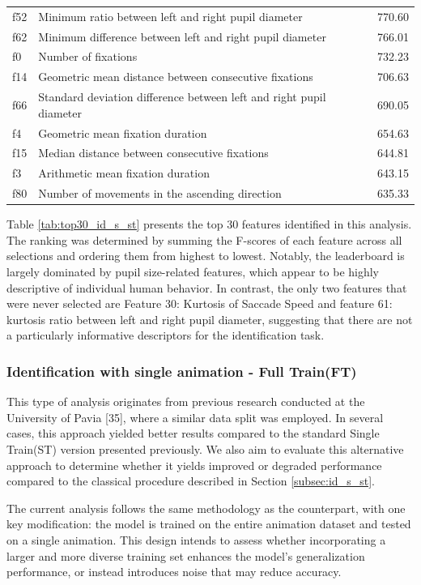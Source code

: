 \documentclass{article}
\begin{document}
\begin{table}[htbp]
\begin{tabular}{lll}
f52 & Minimum ratio between left and right pupil diameter & 770.60 \\
f62 & Minimum difference between left and right pupil diameter & 766.01 \\
f0 & Number of fixations & 732.23 \\
f14 & Geometric mean distance between consecutive fixations & 706.63 \\
f66 & Standard deviation difference between left and right pupil diameter & 690.05 \\
f4 & Geometric mean fixation duration & 654.63 \\
f15 & Median distance between consecutive fixations & 644.81 \\
f3 & Arithmetic mean fixation duration & 643.15 \\
f80 & Number of movements in the ascending direction & 635.33 \\
\bottomrule
\end{tabular}
\end{table}

Table \ref{tab:top30_id_s_st} presents the top 30 features identified in this analysis.
The ranking was determined by summing the F-scores of each feature across all selections and ordering them from highest to lowest.
Notably, the leaderboard is largely dominated by pupil size-related features, which appear to be highly descriptive of individual human behavior.
In contrast, the only two features that were never selected are Feature 30: Kurtosis of Saccade Speed and feature 61: kurtosis ratio between left and right pupil diameter, suggesting that there are not a particularly informative descriptors for the identification task.
\FloatBarrier

\subsubsection{Identification with single animation - Full Train(FT)}
\label{subsec:id_s_ft}

This type of analysis originates from previous research conducted at the University of Pavia [35], where a similar data split was employed. 
In several cases, this approach yielded better results compared to the standard Single Train(ST) version presented previously.
We also aim to evaluate this alternative approach to determine whether it yields improved or degraded performance compared to the classical procedure described in Section \ref{subsec:id_s_st}. 

The current analysis follows the same methodology as the counterpart, with one key modification: the model is trained on the entire animation dataset and tested on a single animation. 
This design intends to assess whether incorporating a larger and more diverse training set enhances the model's generalization performance, or instead introduces noise that may reduce accuracy.
\end{document}
